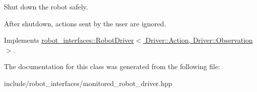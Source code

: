 Shut down the robot safely. 

After shutdown, actions sent by the user are ignored. 

Implements \hyperlink{classrobot__interfaces_1_1RobotDriver_a3451fb8b15d2840b559f3ee858de01f8}{robot\+\_\+interfaces\+::\+Robot\+Driver$<$ Driver\+::\+Action, Driver\+::\+Observation $>$}.



The documentation for this class was generated from the following file\+:\begin{DoxyCompactItemize}
\item 
include/robot\+\_\+interfaces/monitored\+\_\+robot\+\_\+driver.\+hpp\end{DoxyCompactItemize}
